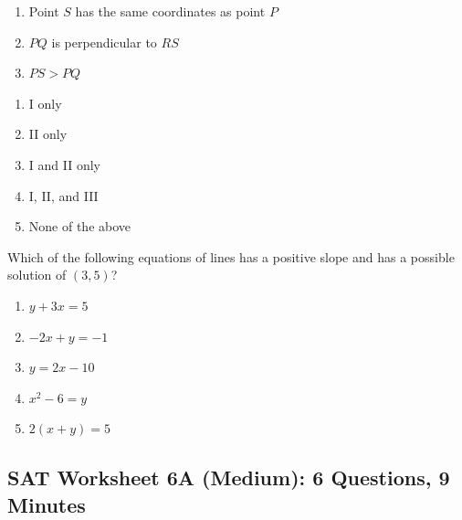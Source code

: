 \begin{multienumerate}
{\begin{enumerate}[label=\Roman*.]
\item Point $S$ has the same coordinates as point $P$
\item $PQ$ is perpendicular to $RS$
\item $PS>PQ$
\end{enumerate}

\begin{enumerate}[label=(\Alph*)]
\item I only
\item II only
\item I and II only
\item I, II, and III
\item None of the above
\end{enumerate}
}

\vfill
{}
{Which of the following equations of lines has a positive slope and has a possible solution of $(3,5)$?

\begin{enumerate}[label=(\Alph*)]
\item $y+3x=5$
\item $-2x+y= -1$
\item $y=2x-10$
\item $x^2-6=y$
\item $2(x+y)=5$
\end{enumerate}}
\end{multienumerate}

\newpage
\subsection{SAT Worksheet 6A (Medium): 6 Questions, 9 Minutes}

